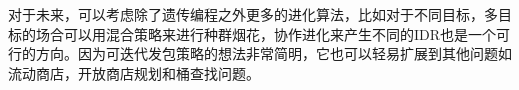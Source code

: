 对于未来，可以考虑除了遗传编程之外更多的进化算法，比如对于不同目标，多目标的场合可以用混合策略来进行种群烟花，协作进化来产生不同的IDR也是一个可行的方向。因为可迭代发包策略的想法非常简明，它也可以轻易扩展到其他问题如流动商店，开放商店规划和桶查找问题。